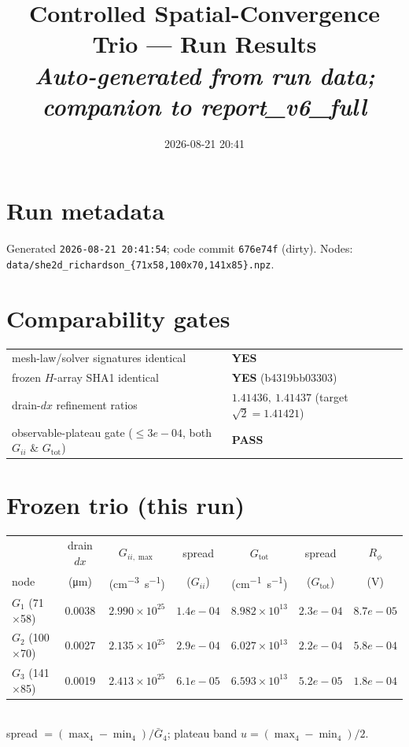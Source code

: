 \documentclass[11pt]{article}
\title{\textbf{Controlled Spatial-Convergence Trio --- Run Results}\\[3pt]
\large\textit{Auto-generated from run data; companion to report\_v6\_full}}
\date{2026-08-21 20:41}\author{}
\begin{document}
\maketitle\vspace{-2.2em}
\begin{center}\end{center}
\section*{Run metadata}
Generated \texttt{2026-08-21 20:41:54}; code commit \texttt{676e74f} (dirty). Nodes:
\texttt{data/she2d\_richardson\_\{71x58,100x70,141x85\}.npz}.
\section*{Comparability gates}
\begin{tabular}{ll}\toprule
mesh-law/solver signatures identical & \textbf{YES} \\
frozen $H$-array SHA1 identical & \textbf{YES} (b4319bb03303) \\
drain-$dx$ refinement ratios & $1.41436,\ 1.41437$ (target $\sqrt2=1.41421$) \\
observable-plateau gate ($\le3e-04$, both $G_{ii}$ \& $G_{\mathrm{tot}}$) & \textbf{PASS} \\
\bottomrule\end{tabular}
\section*{Frozen trio (this run)}
\begin{tabular}{lcccccc}\toprule
 & drain $dx$ & $G_{ii,\max}$ & spread & $G_{\mathrm{tot}}$ & spread & $R_\phi$ \\
node & (\si{\micro m}) & (\si{cm^{-3}s^{-1}}) & ($G_{ii}$) & (\si{cm^{-1}s^{-1}}) & ($G_{\mathrm{tot}}$) & (V) \\ \midrule
$G_1$ (71$\times$58) & 0.0038 & $2.990\times10^{25}$ & $1.4e-04$ & $8.982\times10^{13}$ & $2.3e-04$ & $8.7e-05$ \\
$G_2$ (100$\times$70) & 0.0027 & $2.135\times10^{25}$ & $2.9e-04$ & $6.027\times10^{13}$ & $2.2e-04$ & $5.8e-04$ \\
$G_3$ (141$\times$85) & 0.0019 & $2.413\times10^{25}$ & $6.1e-05$ & $6.593\times10^{13}$ & $5.2e-05$ & $1.8e-04$ \\
\bottomrule\end{tabular}\\[4pt]
{\footnotesize spread $=(\max_4-\min_4)/\bar G_4$; plateau band $u=(\max_4-\min_4)/2$.}
\end{document}
